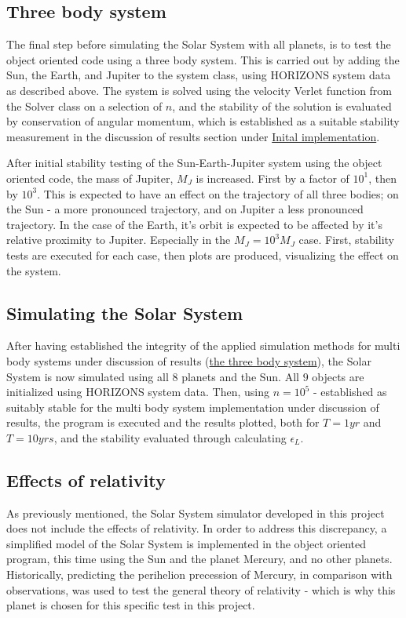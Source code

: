 \documentclass[%
oneside,                 %
final,                   %
10pt]{article}
\begin{document}
\subsection{Three body system}
\label{sec:Modmultibody}
The final step before simulating the Solar System with all planets, is to test the object oriented code using a three body system. This is carried out by adding the Sun, the Earth, and Jupiter to the system class, using HORIZONS system data as described above. The system is solved using the velocity Verlet function from the Solver class on a selection of $n$, and the stability of the solution is evaluated by conservation of angular momentum, which is established as a suitable stability measurement in the discussion of results section under \hyperref[subsec:Discofres:initimpl]{Inital implementation}. \newline

After initial stability testing of the Sun-Earth-Jupiter system using the object oriented code, the mass of Jupiter, $M_J$ is increased. First by a factor of $10^1$, then by $10^3$. This is expected to have an effect on the trajectory of all three bodies; on the Sun - a more pronounced trajectory, and on Jupiter a less pronounced trajectory. In the case of the Earth, it's orbit is expected to be affected by it's relative proximity to Jupiter. Especially in the $M_J=10^3 M_J$ case. First, stability tests are executed for each case, then plots are produced, visualizing the effect on the system.
  
\subsection{Simulating the Solar System}
\label{subsec:SSsim}
After having established the integrity of the applied simulation methods for multi body systems under discussion of results (\hyperref[subsec:Discofres:3B]{the three body system}), the Solar System is now simulated using all $8$ planets and the Sun. All $9$ objects are initialized using HORIZONS system data. Then, using $n=10^5$ - established as suitably stable for the multi body system implementation under discussion of results, the program is executed and the results plotted, both for $T=1yr$ and $T=10yrs$, and the stability evaluated through calculating $\epsilon_L$. 

 
\subsection{Effects of relativity}
\label{sec:M.effectsofrel}
As previously mentioned, the Solar System simulator developed in this project does not include the effects of relativity. In order to address this discrepancy, a simplified model of the Solar System is implemented in the object oriented program, this time using the Sun and the planet Mercury, and no other planets. Historically, predicting the perihelion precession of Mercury, in comparison with observations, was used to test the general theory of relativity - which is why this planet is chosen for this specific test in this project. \newline
\end{document}
